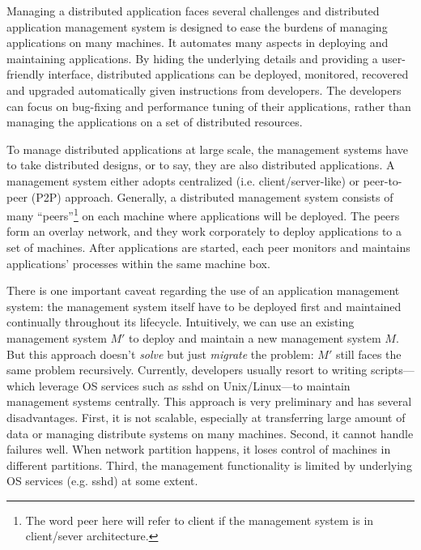 Managing a distributed application faces several challenges
and distributed application management system is designed to
ease the burdens of managing applications on many machines.
It automates many aspects in deploying and maintaining
applications. By hiding the underlying details and providing
a user-friendly interface, distributed applications can be
deployed, monitored, recovered and upgraded automatically
given instructions from developers. The developers can focus
on bug-fixing and performance tuning of their applications,
rather than managing the applications on a set of
distributed resources.

To manage distributed applications at large scale, the
management systems have to take distributed designs, or to
say, they are also distributed applications. A management
system either adopts centralized (i.e. client/server-like)
or peer-to-peer (P2P) approach.  Generally, a distributed
management system consists of many ``peers''\footnote{The
word peer here will refer to client if the management system
is in client/sever architecture.} on each machine where
applications will be deployed. The peers form an overlay
network, and they work corporately to deploy applications to
a set of machines. After applications are started, each peer
monitors and maintains applications' processes within the
same machine box.

There is one important caveat regarding the use of an
application management system: the management system itself
have to be deployed first and maintained continually
throughout its lifecycle. Intuitively, we can use an
existing management system $M'$ to deploy and maintain a new
management system $M$. But this approach doesn't
\emph{solve} but just \emph{migrate} the problem: $M'$ still
faces the same problem recursively.  Currently, developers
usually resort to writing scripts---which leverage OS
services such as sshd on Unix/Linux---to maintain management
systems centrally. This approach is very preliminary and has
several disadvantages.  First, it is not scalable,
especially at transferring large amount of data or managing
distribute systems on many machines. Second, it cannot
handle failures well. When network partition happens, it
loses control of machines in different partitions. Third, the
management functionality is limited by underlying OS
services (e.g. sshd) at some extent.

